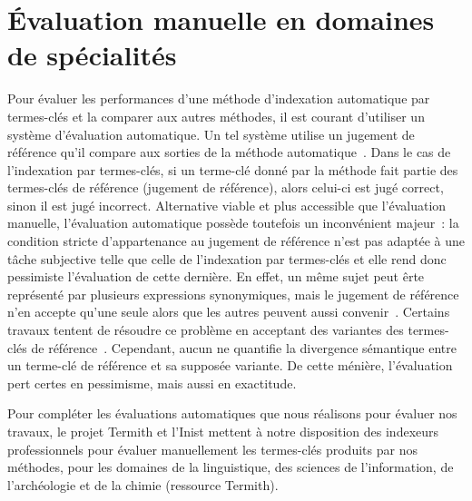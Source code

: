   \section{Évaluation manuelle en domaines de spécialités}
  \label{sec:main-domain_specific_keyphrase_annotation-manual_evaluation}
    Pour évaluer les performances d'une méthode d'indexation automatique par
    termes-clés et la comparer aux autres méthodes, il est courant d'utiliser un
    système d'évaluation automatique. Un tel système utilise un jugement de
    référence qu'il compare aux sorties de la méthode
    automatique~\cite{voorhees2002philosophy}. Dans le cas de l'indexation par
    termes-clés, si un terme-clé donné par la méthode fait partie des
    termes-clés de référence (jugement de référence), alors celui-ci est jugé
    correct, sinon il est jugé incorrect. Alternative viable et plus accessible
    que l'évaluation manuelle, l'évaluation automatique possède toutefois un
    inconvénient majeur~: la condition stricte d'appartenance au jugement de
    référence n'est pas adaptée à une tâche subjective telle que celle de
    l'indexation par termes-clés et elle rend donc pessimiste l'évaluation de
    cette dernière. En effet, un même sujet peut êrte représenté par plusieurs
    expressions synonymiques, mais le jugement de référence n'en accepte qu'une
    seule alors que les autres peuvent aussi
    convenir~\cite{hasan2014state_of_the_art}. Certains travaux tentent de
    résoudre ce problème en acceptant des variantes des termes-clés de
    référence~\cite{zesch2009rprecision,kim2010rprecision}. Cependant, aucun ne
    quantifie la divergence sémantique entre un terme-clé de référence et sa
    supposée variante. De cette ménière, l'évaluation pert certes en pessimisme,
    mais aussi en exactitude.
    
    Pour compléter les évaluations automatiques que nous réalisons pour évaluer
    nos travaux, le projet Termith et l'Inist mettent à notre disposition des
    indexeurs professionnels pour évaluer manuellement les termes-clés produits
    par nos méthodes, pour les domaines de la linguistique, des sciences de
    l'information, de l'archéologie et de la chimie (ressource Termith).

